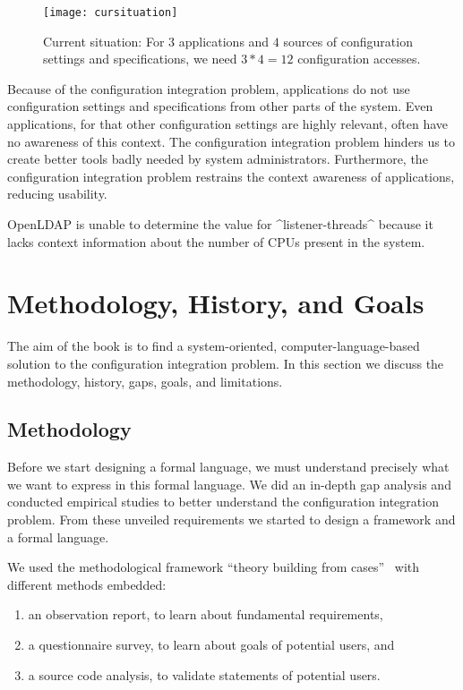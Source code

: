 \begin{figure}[htp]
\centering
\texttt{[image: cursituation]}
\caption[Current Situation.]{Current situation: For $3$ applications and $4$ sources of configuration settings and specifications, we need $3*4=12$ configuration accesses.}
\label{fig:cursituation}
\end{figure}

Because of the configuration integration problem, applications do not use configuration settings and specifications from other parts of the system.
Even applications, for that other configuration settings are highly relevant, often have no awareness of this context.
The configuration integration problem hinders us to create better tools badly needed by system administrators.
Furthermore, the configuration integration problem restrains the context awareness of applications, reducing usability.
\begin{example}
OpenLDAP is unable to determine the value for ^listener-threads^ because it lacks context information about the number of CPUs present in the system.
\end{example}





\section{Methodology, History, and Goals}

The aim of the book is to find a system-oriented, computer-language-based solution to the configuration integration problem.
In this section we discuss the methodology, history, gaps, goals, and limitations.

\subsection{Methodology}

Before we start designing a formal language, we must understand precisely what we want to express in this formal language.
We did an in-depth gap analysis and conducted empirical studies to better understand the configuration integration problem.
From these unveiled requirements we started to design a framework and a formal language.

We used the methodological framework \enquote{theory building from cases}~\cite{easterbrook2008selecting,eisenhardt2007theory} with different methods embedded:

\begin{enumerate}
\item an observation report, to learn about fundamental requirements,
\item a questionnaire survey, to learn about goals of potential users, and
\item a source code analysis, to validate statements of potential users.
\end{enumerate}

